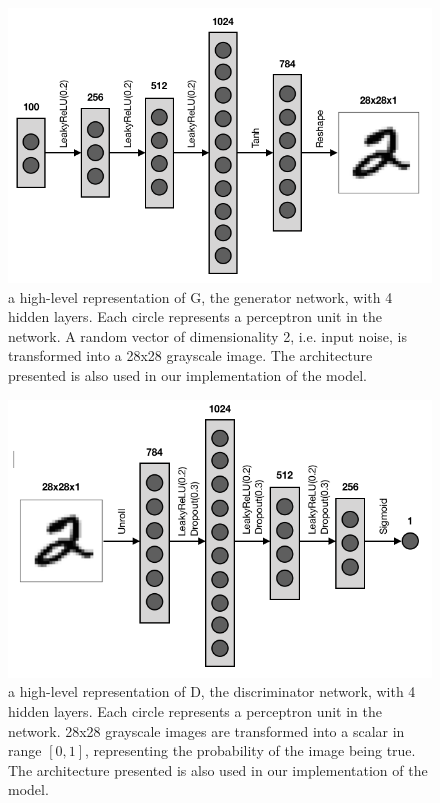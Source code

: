 \begin{figure}
	\begin{center}
		\includegraphics*[scale=0.25]{./plots/G_model.png}	
	\end{center}
	\caption{a high-level representation of G, the generator network, with 4 hidden layers. Each circle represents a perceptron unit in the network. A random vector of dimensionality 2, i.e. input noise, is transformed into a 28x28 grayscale image. The architecture presented is also used in our implementation of the model.}
	\label{fig:netG}
\end{figure}
\begin{figure}
	\begin{center}
		\includegraphics*[scale=0.25]{./plots/D_model.png}		
	\end{center}
	\caption{a high-level representation of D, the discriminator network, with 4 hidden layers. Each circle represents a perceptron unit in the network. 28x28 grayscale images are transformed into a scalar in range $[0,1]$, representing the probability of the image being true. The architecture presented is also used in our implementation of the model.}
	\label{fig:netD}
\end{figure}
